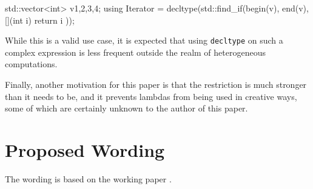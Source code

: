 \documentclass[11pt]{article}
\newcommand{\cc}[1]{\texttt{#1}}
\begin{document}
\begin{cpp}
std::vector<int> v{1,2,3,4};
using Iterator = decltype(std::find_if(begin(v), end(v), [](int i) {
  return i %
}));
\end{cpp}

While this is a valid use case, it is expected that using \cc{decltype} on
such a complex expression is less frequent outside the realm of heterogeneous
computations.

Finally, another motivation for this paper is that the restriction is much stronger
than it needs to be, and it prevents lambdas from being used in creative ways,
some of which are certainly unknown to the author of this paper.

\section{Proposed Wording}
The wording is based on the working paper \cite{N4296}.
\end{document}
